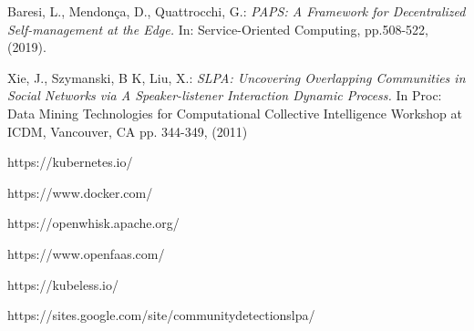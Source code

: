 \begin{thebibliography}{9}
        Baresi, L., Mendonça, D., Quattrocchi, G.: 
        \textit{PAPS: A Framework for Decentralized Self-management at the Edge.}
        In: Service-Oriented Computing, pp.508-522, (2019).   

        Xie, J., Szymanski, B K, Liu, X.:
        \textit{SLPA: Uncovering Overlapping Communities in Social Networks via
        A Speaker-listener Interaction Dynamic Process.}
        In Proc: Data Mining Technologies for Computational Collective 
        Intelligence Workshop at ICDM, Vancouver, CA pp. 344-349, (2011)

        https://kubernetes.io/

        https://www.docker.com/

        https://openwhisk.apache.org/

        https://www.openfaas.com/

        https://kubeless.io/

        https://sites.google.com/site/communitydetectionslpa/    

\end{thebibliography}